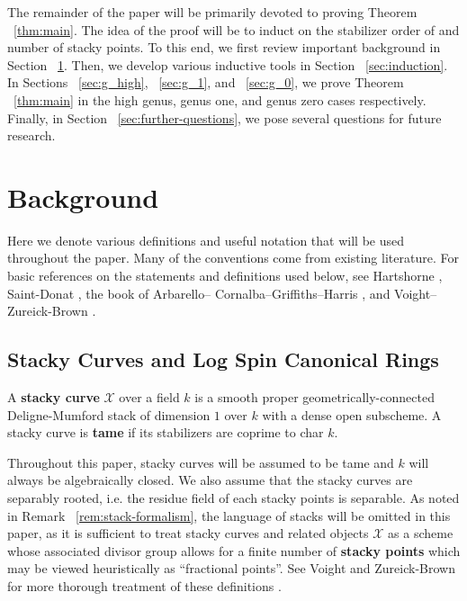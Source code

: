 \documentclass{amsart}
\theoremstyle{plain}
\theoremstyle{definition}
\theoremstyle{remark}
\numberwithin{equation}{section}
\newcommand\ssec{\subsection}
\newcommand \sx{\mathscr X}
\begin{document}
The remainder of the paper will be primarily devoted to proving
Theorem ~\ref{thm:main}. The idea of the
proof will be to induct on the stabilizer order of and number of stacky points. To this end, we first review important background in
Section ~\ref{sec:background}. Then, we develop various inductive
tools in Section ~\ref{sec:induction}. In Sections ~\ref{sec:g_high},
~\ref{sec:g_1}, and ~\ref{sec:g_0}, we prove Theorem
~\ref{thm:main} in the high genus, genus
one, and genus zero cases respectively. Finally, in Section
~\ref{sec:further-questions}, we pose several questions for future
research.



\section{Background}
\label{sec:background}
Here we denote various definitions and useful notation that will be
used throughout the paper. Many of the conventions come from existing
literature. For basic references on the statements and definitions
used below, see Hartshorne \cite[Chapter IV]{hartshorne:ag},
Saint-Donat \cite{saint-donat:proj}, the book of Arbarello--
Cornalba--Griffiths--Harris \cite[Section III.2]
{acgh:algebraic-curves}, and Voight--Zureick-Brown \cite[Chapter 2,
Chapter 5]{vzb:stacky}.

\ssec{Stacky Curves and Log Spin Canonical Rings}
\label{ssec:stacky-background}
A \textbf{stacky curve} $\sx$ over a field $k$ is a smooth proper
geometrically-connected Deligne-Mumford stack of dimension $1$ over
$k$ with a dense open subscheme. A stacky curve is \textbf{tame} if
its stabilizers are coprime to char $k$.

Throughout this paper, stacky curves will be assumed to be tame and
$k$ will always be algebraically closed. We also assume that the
stacky curves are separably rooted, i.e. the residue field of each
stacky points is separable. As noted in Remark
~\ref{rem:stack-formalism}, the language of stacks will be omitted
in this paper, as it is sufficient to treat stacky curves and
related objects $\sx$ as a scheme whose associated divisor group
allows for a finite number of \textbf{stacky points} which may be
viewed heuristically as ``fractional points''. See Voight and
Zureick-Brown for more thorough treatment of these definitions
\cite[Chapter 5]{vzb:stacky}.
\end{document}

